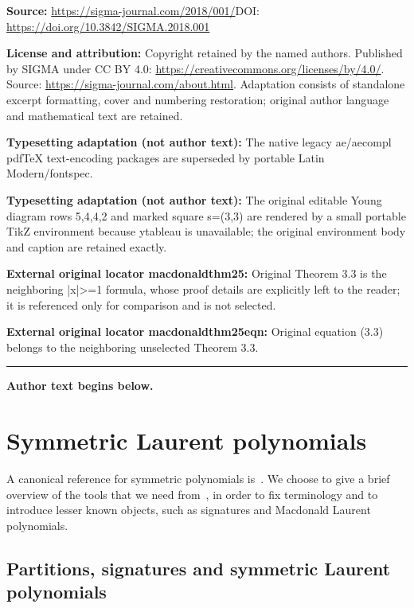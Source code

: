 \documentclass[11pt]{article}
\numberwithin{equation}{section}
\begin{document}
\noindent\textbf{Source:} \url{https://sigma-journal.com/2018/001/}\quad DOI: \url{https://doi.org/10.3842/SIGMA.2018.001}\par
\noindent\textbf{License and attribution:} Copyright retained by the named authors. Published by SIGMA under CC BY 4.0: \url{https://creativecommons.org/licenses/by/4.0/}. Source: \url{https://sigma-journal.com/about.html}. Adaptation consists of standalone excerpt formatting, cover and numbering restoration; original author language and mathematical text are retained.\par
\noindent\textbf{Typesetting adaptation (not author text):} The native legacy ae/aecompl pdfTeX text-encoding packages are superseded by portable Latin Modern/fontspec.\par
\noindent\textbf{Typesetting adaptation (not author text):} The original editable Young diagram rows 5,4,4,2 and marked square s=(3,3) are rendered by a small portable TikZ environment because ytableau is unavailable; the original environment body and caption are retained exactly.\par
\noindent\textbf{External original locator macdonaldthm25:} Original Theorem 3.3 is the neighboring |x|>=1 formula, whose proof details are explicitly left to the reader; it is referenced only for comparison and is not selected.\par
\noindent\textbf{External original locator macdonaldthm25eqn:} Original equation (3.3) belongs to the neighboring unselected Theorem 3.3.\par
\medskip\hrule\medskip\noindent\textbf{Author text begins below.}\par
\setcounter{section}{1}
\setcounter{subsection}{4}
\setcounter{subsubsection}{0}
\setcounter{thm}{3}
\setcounter{equation}{5}
\section{Symmetric Laurent polynomials}\label{macdonaldsection}

A canonical reference for symmetric polynomials is~\cite{M2}. We choose to give a brief overview of the tools that we need from~\cite{M2}, in order to f\/ix terminology and to introduce lesser known objects, such as signatures and Macdonald Laurent polynomials.

\subsection{Partitions, signatures and symmetric Laurent polynomials}
\end{document}
